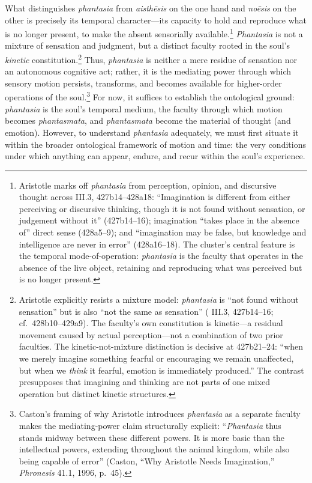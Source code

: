 What distinguishes \textit{phantasia} from \textit{aisthēsis} on the one hand and \textit{noēsis} on the other is precisely its temporal character---its capacity to hold and reproduce what is no longer present, to make the absent sensorially available.\footnote{Aristotle marks off \textit{phantasia} from perception, opinion, and discursive thought across \cite{aristotle2014soul} III.3, 427b14--428a18: ``Imagination is different from either perceiving or discursive thinking, though it is not found without sensation, or judgement without it'' (427b14--16); imagination ``takes place in the absence of'' direct sense (428a5--9); and ``imagination may be false, but knowledge and intelligence are never in error'' (428a16--18). The cluster's central feature is the temporal mode-of-operation: \textit{phantasia} is the faculty that operates in the absence of the live object, retaining and reproducing what was perceived but is no longer present.} \textit{Phantasia} is not a mixture of sensation and judgment, but a distinct faculty rooted in the soul's \textit{kinetic} constitution.\footnote{Aristotle explicitly resists a mixture model: \textit{phantasia} is ``not found without sensation'' but is also ``not the same as sensation'' (\cite{aristotle2014soul} III.3, 427b14--16; cf.~428b10--429a9). The faculty's own constitution is kinetic---a residual movement caused by actual perception---not a combination of two prior faculties. The kinetic-not-mixture distinction is decisive at 427b21--24: ``when we merely imagine something fearful or encouraging we remain unaffected, but when we \textit{think} it fearful, emotion is immediately produced.'' The contrast presupposes that imagining and thinking are not parts of one mixed operation but distinct kinetic structures.} Thus, \textit{phantasia} is neither a mere residue of sensation nor an autonomous cognitive act; rather, it is the mediating power through which sensory motion persists, transforms, and becomes available for higher-order operations of the soul.\footnote{Caston's framing of why Aristotle introduces \textit{phantasia} as a separate faculty makes the mediating-power claim structurally explicit: ``\textit{Phantasia} thus stands midway between these different powers. It is more basic than the intellectual powers, extending throughout the animal kingdom, while also being capable of error'' (Caston, ``Why Aristotle Needs Imagination,'' \textit{Phronesis} 41.1, 1996, p.~45).} For now, it suffices to establish the ontological ground: \textit{phantasia} is the soul's temporal medium, the faculty through which motion becomes \textit{phantasmata}, and \textit{phantasmata} become the material of thought (and emotion). However, to understand \textit{phantasia} adequately, we must first situate it within the broader ontological framework of motion and time: the very conditions under which anything can appear, endure, and recur within the soul's experience.

